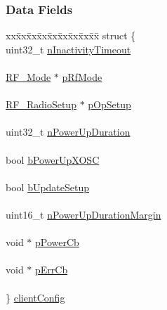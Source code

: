 \subsubsection*{Data Fields}
\begin{DoxyCompactItemize}
\item 
\begin{tabbing}
xx\=xx\=xx\=xx\=xx\=xx\=xx\=xx\=xx\=\kill
struct \{\\
\>uint32\_t \hyperlink{struct_r_f___object_acab4c0d923181e985a2867b51f74edcc}{nInactivityTimeout}\\
\>\\
\>\hyperlink{struct_r_f___mode}{RF\_Mode} $\ast$ \hyperlink{struct_r_f___object_a54a6ee0cde609ca67902a16f9279ca42}{pRfMode}\\
\>\\
\>\hyperlink{union_r_f___radio_setup}{RF\_RadioSetup} $\ast$ \hyperlink{struct_r_f___object_a1a082f0e3e4d1cc3d42438e9c008731a}{pOpSetup}\\
\>\\
\>uint32\_t \hyperlink{struct_r_f___object_a1c977babafc1c400ee7065d588400d62}{nPowerUpDuration}\\
\>\\
\>bool \hyperlink{struct_r_f___object_a2639ebccaae9e421775673e83d477d93}{bPowerUpXOSC}\\
\>\\
\>bool \hyperlink{struct_r_f___object_aca08b9616cfe2b6be9699edea541334d}{bUpdateSetup}\\
\>\\
\>uint16\_t \hyperlink{struct_r_f___object_a39f22fc67c1062a68306baee91bf613a}{nPowerUpDurationMargin}\\
\>\\
\>void $\ast$ \hyperlink{struct_r_f___object_ab93839cd7dc102b3eb1c79a3dceb194d}{pPowerCb}\\
\>\\
\>void $\ast$ \hyperlink{struct_r_f___object_adf7c2500d579f201e49a6c87e447991b}{pErrCb}\\
\>\\
\} \hyperlink{struct_r_f___object_aa469075966fd8d652e93528c33a02578}{clientConfig}\\


\end{tabbing}
\end{DoxyCompactItemize}
